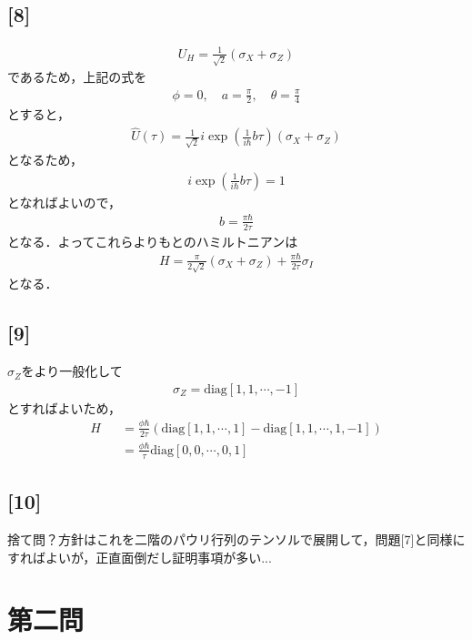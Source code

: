 \documentclass[12pt,dvipdfmx]{jsarticle}
\begin{document}
\subsection*{\large{[8]}}
\begin{eqnarray}
  U_H = \frac{1}{\sqrt{2}}\left( \sigma_X + \sigma_Z \right)
\end{eqnarray}
であるため，上記の式を
\begin{eqnarray}
  \phi=0,\quad a=\frac{\pi}{2}, \quad \theta=\frac{\pi}{4}
\end{eqnarray}
とすると，
\begin{eqnarray}
  \hat{U}(\tau) = \frac{1}{\sqrt{2}} i \exp\left( \frac{1}{i\hbar}b\tau \right) \left( \sigma_X + \sigma_Z  \right)
\end{eqnarray}
となるため，
\begin{eqnarray}
  i \exp\left( \frac{1}{i\hbar}b\tau \right)= 1
\end{eqnarray}
となればよいので，
\begin{eqnarray}
  b = \frac{\pi\hbar}{2\tau}
\end{eqnarray}
となる．よってこれらよりもとのハミルトニアンは
\begin{eqnarray}
  H = \frac{\pi}{2\sqrt{2}}\left( \sigma_X + \sigma_Z \right) + \frac{\pi\hbar}{2\tau}\sigma_I
\end{eqnarray}
となる．

\subsection*{\large{[9]}}
$\sigma_Z$をより一般化して
\begin{eqnarray}
  \sigma_Z =\text{diag}[1,1,\cdots,-1]
\end{eqnarray}
とすればよいため，
\begin{eqnarray}
  H &&= \frac{\phi\hbar}{2\tau}\left( \text{diag}[1,1,\cdots,1]-\text{diag}[1,1,\cdots,1,-1] \right) \\
  &&=\frac{\phi\hbar}{\tau}\text{diag}[0,0,\cdots,0,1]
\end{eqnarray}

\subsection*{\large{[10]}}
捨て問？方針はこれを二階のパウリ行列のテンソルで展開して，問題[7]と同様にすればよいが，正直面倒だし証明事項が多い...
\newpage

\section*{\Large{第二問}}
\end{document}
